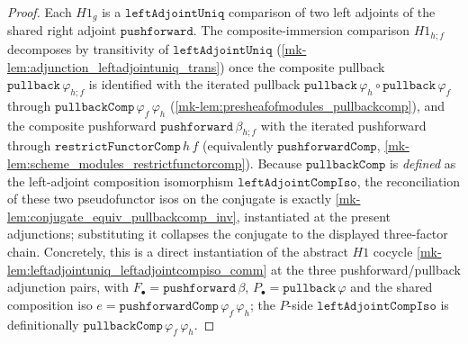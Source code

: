 \begin{proof}
  \leanok
  Each \(H1_g\) is a \(\mathtt{leftAdjointUniq}\) comparison of two left adjoints of the shared right
  adjoint \(\mathtt{pushforward}\). The composite-immersion comparison \(H1_{h \mathbin{;} f}\)
  decomposes by transitivity of \(\mathtt{leftAdjointUniq}\)
  (\ref{mk-lem:adjunction_leftadjointuniq_trans}) once the composite pullback
  \(\mathtt{pullback}\,\varphi_{h \mathbin{;} f}\) is identified with the iterated pullback
  \(\mathtt{pullback}\,\varphi_h \circ \mathtt{pullback}\,\varphi_f\) through
  \(\mathtt{pullbackComp}\,\varphi_f\,\varphi_h\) (\ref{mk-lem:presheafofmodules_pullbackcomp}), and the
  composite pushforward \(\mathtt{pushforward}\,\beta_{h \mathbin{;} f}\) with the iterated pushforward
  through \(\mathtt{restrictFunctorComp}\,h\,f\) (equivalently \(\mathtt{pushforwardComp}\),
  \ref{mk-lem:scheme_modules_restrictfunctorcomp}). Because \(\mathtt{pullbackComp}\) is \emph{defined} as
  the left-adjoint composition isomorphism \(\mathtt{leftAdjointCompIso}\), the reconciliation of these
  two pseudofunctor isos on the conjugate is exactly \ref{mk-lem:conjugate_equiv_pullbackcomp_inv},
  instantiated at the present adjunctions; substituting it collapses the conjugate to the displayed
  three-factor chain. Concretely, this is a direct instantiation of the abstract \(H1\) cocycle
  \ref{mk-lem:leftadjointuniq_leftadjointcompiso_comm} at the three pushforward/pullback adjunction pairs,
  with \(F_\bullet = \mathtt{pushforward}\,\beta\), \(P_\bullet = \mathtt{pullback}\,\varphi\) and the
  shared composition iso \(e = \mathtt{pushforwardComp}\,\varphi_f\,\varphi_h\); the \(P\)-side
  \(\mathtt{leftAdjointCompIso}\) is definitionally \(\mathtt{pullbackComp}\,\varphi_f\,\varphi_h\).
\end{proof}

